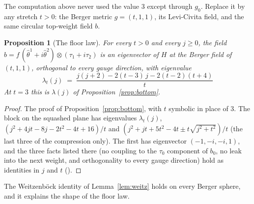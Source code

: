 \documentclass[11pt]{article}
\newtheorem{proposition}[theorem]{Proposition}
\theoremstyle{definition}
\theoremstyle{remark}
\begin{document}
The computation above never used the value $3$ except through $g_0$. Replace it by any stretch $t>0$:
the Berger metric $g=(t,1,1)$, its Levi-Civita field, and the same circular top-weight field $b$.

\begin{proposition}[The floor law]\label{prop:family}
For every $t>0$ and every $j\ge0$, the field $b=f\,(\hat\theta^1+i\hat\theta^2)\otimes(\tau_1+i\tau_2)$ is an
eigenvector of $H$ at the Berger field of $(t,1,1)$, orthogonal to every gauge direction, with eigenvalue
\[
  \boxed{\;\lambda_t(j)\;=\;\frac{j(j+2)-2(t-3)\,j-2(t-2)(t+4)}{t}\;}
\]
At $t=3$ this is $\lambda(j)$ of Proposition~\ref{prop:bottom}.
\end{proposition}
\begin{proof}
The proof of Proposition~\ref{prop:bottom}, with $t$ symbolic in place of $3$. The block on the squashed
plane has eigenvalues $\lambda_t(j)$, $(j^2+4jt-8j-2t^2-4t+16)/t$ and
$(j^2+jt+5t^2-4t\pm t\sqrt{j^2+t^2})/t$ (the last three of the compression only). The first has eigenvector $(-1,-i,-i,1)$, and the three facts
listed there (no coupling to the $\tau_0$ component of $b_0$, no leak into the next weight, and
orthogonality to every gauge direction) hold as identities in $j$ and $t$
().
\end{proof}

The Weitzenb\"ock identity of Lemma~\ref{lem:weitz} holds on every Berger sphere, and it explains the
shape of the floor law.
\end{document}
